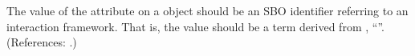 The value of the attribute  on a \Reaction object should be
an SBO identifier referring to an interaction framework.  That is, the
value should be a term derived from \sbointeractionID, ``''.
(References: .)
